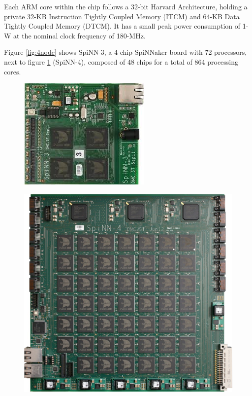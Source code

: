 Each ARM core within the chip follows a 32-bit Harvard Architecture, holding a private 32-KB Instruction Tightly Coupled Memory (ITCM) and 64-KB Data Tightly Coupled Memory (DTCM).\cite{painkras} It has a small peak power consumption of 1-W at the nominal clock frequency of 180-MHz.\cite{arm968}

Figure \ref{fig:4node} shows SpiNN-3, a 4 chip SpiNNaker board with 72 processors, next to figure \ref{fig:48node} (SpiNN-4), composed of 48 chips for a total of 864 processing cores.

\begin{figure}
\centering
\begin{minipage}{.5\textwidth}
  \centering
  \includegraphics[width=0.4\linewidth, natwidth=245, natheight=205]{images/4node.jpg}
  \label{fig:4node}
\end{minipage}%
\begin{minipage}{.5\textwidth}
  \centering
  \includegraphics[width=0.9\linewidth, natwidth=945, natheight=896]{images/48node.jpg}
  \label{fig:48node}
\end{minipage}
\end{figure}

